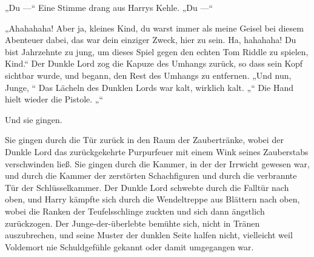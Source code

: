 „Du —“ Eine Stimme drang aus Harrys Kehle.
„Du —“

„Ahahahaha! Aber ja, kleines Kind, du warst immer als meine Geisel bei diesem Abenteuer dabei, das war dein einziger Zweck, hier zu sein. Ha, hahahaha! Du bist Jahrzehnte zu jung, um dieses Spiel gegen den echten Tom Riddle zu spielen, Kind.“
Der Dunkle Lord zog die Kapuze des Umhangs zurück, so dass sein Kopf sichtbar wurde, und begann, den Rest des Umhangs zu entfernen.
„Und nun, Junge, “
Das Lächeln des Dunklen Lords war kalt, wirklich kalt.
„“
Die Hand hielt wieder die Pistole.
„“

Und sie gingen.

Sie gingen durch die Tür zurück in den Raum der Zaubertränke, wobei der Dunkle Lord das zurückgekehrte Purpurfeuer mit einem Wink seines Zauberstabs verschwinden ließ. Sie gingen durch die Kammer, in der der Irrwicht gewesen war, und durch die Kammer der zerstörten Schachfiguren und durch die verbrannte Tür der Schlüsselkammer. Der Dunkle Lord schwebte durch die Falltür nach oben, und Harry kämpfte sich durch die Wendeltreppe aus Blättern nach oben, wobei die Ranken der Teufelsschlinge zuckten und sich dann ängstlich zurückzogen. Der Junge-der-überlebte bemühte sich, nicht in Tränen auszubrechen, und seine Muster der dunklen Seite halfen nicht, vielleicht weil Voldemort nie Schuldgefühle gekannt oder damit umgegangen war.


